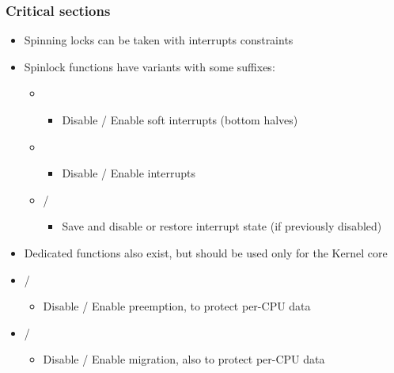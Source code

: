 \begin{frame}
        \frametitle{Critical sections}
        \begin{itemize}
                \item Spinning locks can be taken with interrupts constraints
                \item Spinlock functions have variants with some suffixes:
                \begin{itemize}
                \item {}
                        \begin{itemize}
                                \item Disable / Enable soft interrupts (bottom halves)
                        \end{itemize}
                \item {}
                        \begin{itemize}
                                \item Disable / Enable interrupts
                        \end{itemize}
                \item {} / 
                        \begin{itemize}
                                \item Save and disable or restore interrupt state (if previously disabled)
                        \end{itemize}
                \end{itemize}
                \item Dedicated functions also exist, but should be used only for the Kernel core
                \item {} / 
                        \begin{itemize}
                                \item Disable / Enable preemption, to protect per-CPU data
                        \end{itemize}
                \item {} / 
                        \begin{itemize}
                                \item Disable / Enable migration, also to protect per-CPU data
                        \end{itemize}

        \end{itemize}
\end{frame}

